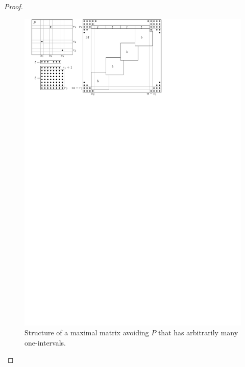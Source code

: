 \begin{proof}
\begin{figure}[!ht]
\centering
\includegraphics[width=120mm]{img/manyints.pdf}
\caption{Structure of a maximal matrix avoiding $P$ that has arbitrarily many one-intervals.}
\label{manyIntsFig}
\end{figure}
\end{proof}

